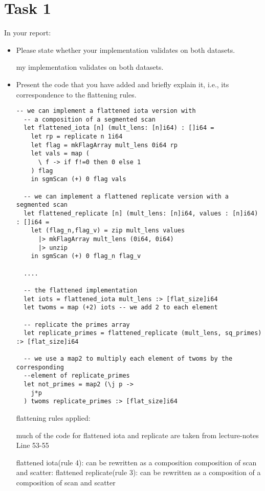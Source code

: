 \documentclass{article}
\begin{document}
\section{Task 1}

In your report:

\begin{itemize}
  \item Please state whether your implementation validates on both datasets.
  
  my implementation validates on both datasets.
  \item Present the code that you have added and briefly explain it, i.e., its correspondence to the flattening rules.
  \begin{lstlisting}[language=futhark, basicstyle=\footnotesize]
  -- we can implement a flattened iota version with 
  -- a composition of a segmented scan
  let flattened_iota [n] (mult_lens: [n]i64) : []i64 =
    let rp = replicate n 1i64
    let flag = mkFlagArray mult_lens 0i64 rp 
    let vals = map (
      \ f -> if f!=0 then 0 else 1
    ) flag 
    in sgmScan (+) 0 flag vals

  -- we can implement a flattened replicate version with a segmented scan 
  let flattened_replicate [n] (mult_lens: [n]i64, values : [n]i64) : []i64 =
    let (flag_n,flag_v) = zip mult_lens values 
      |> mkFlagArray mult_lens (0i64, 0i64) 
      |> unzip
    in sgmScan (+) 0 flag_n flag_v

  ....

  -- the flattened implementation 
  let iots = flattened_iota mult_lens :> [flat_size]i64
  let twoms = map (+2) iots -- we add 2 to each element

  -- replicate the primes array
  let replicate_primes = flattened_replicate (mult_lens, sq_primes) :> [flat_size]i64

  -- we use a map2 to multiply each element of twoms by the corresponding 
  --element of replicate_primes
  let not_primes = map2 (\j p -> 
    j*p
  ) twoms replicate_primes :> [flat_size]i64
  \end{lstlisting}

  flattening rules applied:

  much of the code for flattened iota and replicate are taken from lecture-notes Line 53-55

  flattened iota(rule 4): can be rewritten as a composition composition of scan and scatter:
  flattened replicate(rule 3): can be rewritten as a composition of a  composition of scan and scatter


\end{itemize}
\end{document}
